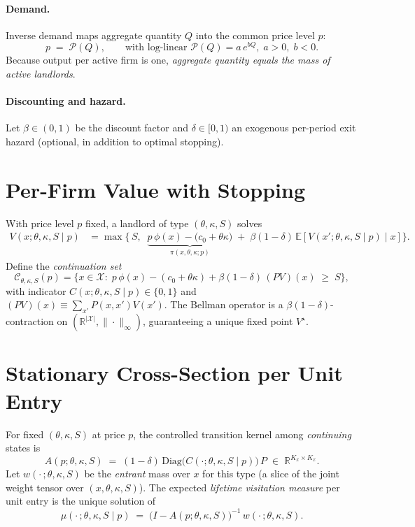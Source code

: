 \documentclass[11pt]{article}
\begin{document}
\paragraph{Demand.}
Inverse demand maps aggregate quantity $Q$ into the common price level $p$:
\begin{equation}
p \;=\; \mathcal{P}(Q), \qquad \text{with log-linear } \mathcal{P}(Q)=a\,e^{bQ},\; a>0,\; b<0.
\end{equation}
Because output per active firm is one, \emph{aggregate quantity equals the mass of active landlords}.

\paragraph{Discounting and hazard.}
Let $\beta\in(0,1)$ be the discount factor and $\delta\in[0,1)$ an exogenous per-period exit hazard (optional, in addition to optimal stopping).

\section{Per-Firm Value with Stopping}

With price level $p$ fixed, a landlord of type $(\theta,\kappa,S)$ solves
\begin{align}
V(x;\theta,\kappa,S\mid p)
&= \max\Big\{\, S,\;\; \underbrace{p\,\phi(x) - \big(c_0+\theta\kappa\big)}_{\pi(x,\theta,\kappa;p)}
\;+\; \beta(1-\delta)\,\mathbb{E}\!\left[V(x';\theta,\kappa,S\mid p)\mid x\right] \Big\}.
\label{eq:Bellman}
\end{align}
Define the \emph{continuation set}
\begin{equation}
\mathcal{C}_{\theta,\kappa,S}(p)
=\Big\{x\in\mathcal{X}:\; p\,\phi(x) - (c_0+\theta\kappa) + \beta(1-\delta)\,(PV)(x)\;\ge\; S\Big\},
\end{equation}
with indicator $C(x;\theta,\kappa,S\mid p)\in\{0,1\}$ and $(PV)(x)\equiv\sum_{x'}P(x,x')V(x')$.
The Bellman operator is a $\beta(1-\delta)$-contraction on $(\mathbb{R}^{|\mathcal{X}|},\|\cdot\|_\infty)$, guaranteeing a unique fixed point $V^\star$.

\section{Stationary Cross-Section per Unit Entry}

For fixed $(\theta,\kappa,S)$ at price $p$, the controlled transition kernel among \emph{continuing} states is
\begin{equation}
A(p;\theta,\kappa,S)
\;=\; (1-\delta)\,\mathrm{Diag}\!\Big(C(\cdot;\theta,\kappa,S\mid p)\Big)\,P
\;\in\; \mathbb{R}^{K_x\times K_x}.
\end{equation}
Let $w(\cdot\,;\theta,\kappa,S)$ be the \emph{entrant} mass over $x$ for this type (a slice of the joint weight tensor over $(x,\theta,\kappa,S)$).
The expected \emph{lifetime visitation measure} per unit entry is the unique solution of
\begin{equation}
\mu(\cdot\,;\theta,\kappa,S\mid p)
\;=\;
\big(I - A(p;\theta,\kappa,S)\big)^{-1}\,w(\cdot\,;\theta,\kappa,S).
\label{eq:lifetime}
\end{equation}
\end{document}
